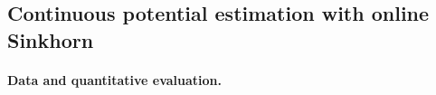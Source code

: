
\subsection{Continuous potential estimation with online Sinkhorn}\label{sec:continuous}

\paragraph{Data and quantitative evaluation.}\label{sec:online_exp}

